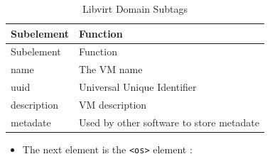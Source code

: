 \documentclass[
  14pt,
  english,
  a4paper,
]{scrreprt}
\providecommand{\tightlist}{%
  \setlength{\itemsep}{0pt}\setlength{\parskip}{0pt}}
\begin{document}
\hypertarget{tbl:lvirt_dom_subtags}{}
\begin{longtable}[]{@{}ll@{}}
\caption{\label{tbl:lvirt_dom_subtags}Libvirt Domain
Subtags}\tabularnewline
\toprule
\begin{minipage}[b]{0.18\columnwidth}\raggedright
Subelement\strut
\end{minipage} & \begin{minipage}[b]{0.56\columnwidth}\raggedright
Function\strut
\end{minipage}\tabularnewline
\midrule
\endfirsthead
\toprule
\begin{minipage}[b]{0.18\columnwidth}\raggedright
Subelement\strut
\end{minipage} & \begin{minipage}[b]{0.56\columnwidth}\raggedright
Function\strut
\end{minipage}\tabularnewline
\midrule
\endhead
\begin{minipage}[t]{0.18\columnwidth}\raggedright
name\strut
\end{minipage} & \begin{minipage}[t]{0.56\columnwidth}\raggedright
The VM name\strut
\end{minipage}\tabularnewline
\begin{minipage}[t]{0.18\columnwidth}\raggedright
uuid\strut
\end{minipage} & \begin{minipage}[t]{0.56\columnwidth}\raggedright
Universal Unique Identifier\strut
\end{minipage}\tabularnewline
\begin{minipage}[t]{0.18\columnwidth}\raggedright
description\strut
\end{minipage} & \begin{minipage}[t]{0.56\columnwidth}\raggedright
VM description\strut
\end{minipage}\tabularnewline
\begin{minipage}[t]{0.18\columnwidth}\raggedright
metadate\strut
\end{minipage} & \begin{minipage}[t]{0.56\columnwidth}\raggedright
Used by other software to store metadate\strut
\end{minipage}\tabularnewline
\bottomrule
\end{longtable}

\begin{itemize}
\tightlist
\item
  The next element is the \texttt{\textless{}os\textgreater{}} element :
\end{itemize}
\end{document}
